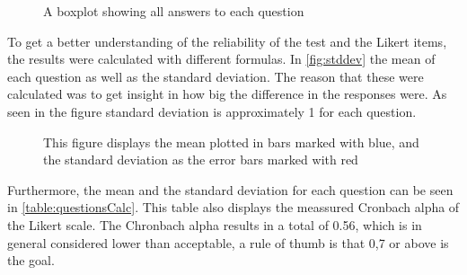 \begin{figure}[H]
	
	\centering
	\caption{A boxplot showing all answers to each question}
	\label{fig:boxploteval}
\end{figure}

To get a better understanding of the reliability of the test and the Likert items, the results were calculated with different formulas. In \autoref{fig:stddev} the mean of each question as well as the standard deviation. The reason that these were calculated was to get insight in how big the difference in the responses were. As seen in the figure standard deviation
is approximately 1 for each question.
\begin{figure}[H]
	
	\centering
	\caption{This figure displays the mean plotted in bars marked with blue, and the standard deviation as the error bars marked with red}
	\label{fig:stddev}
\end{figure}

Furthermore, the mean and the standard deviation for each question can be seen in \autoref{table:questionsCalc}. This table also displays the meassured Cronbach alpha of the Likert scale. The Chronbach alpha results in a total of 0.56, which is in general considered lower than acceptable, a rule of thumb is that 0,7 or above is the goal\cite{DAEBook}.

